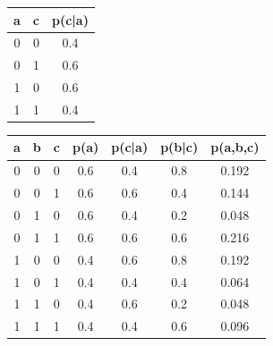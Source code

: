 \begin{exercise}
\begin{solution}
\begin{table}[p]
\begin{tabular}{ccc}
    \hline
    a & c & p(c|a) \\ \hline
    0 & 0 & 0.4    \\
    0 & 1 & 0.6    \\
    1 & 0 & 0.6    \\
    1 & 1 & 0.4    \\ \hline
    \end{tabular}

\begin{tabular}{ccccccc}
    \hline
    a & b & c & p(a) & p(c|a) & p(b|c) & p(a,b,c) \\ \hline
    0 & 0 & 0 & 0.6  & 0.4    & 0.8    & 0.192    \\
    0 & 0 & 1 & 0.6  & 0.6    & 0.4    & 0.144    \\
    0 & 1 & 0 & 0.6  & 0.4    & 0.2    & 0.048    \\
    0 & 1 & 1 & 0.6  & 0.6    & 0.6    & 0.216    \\
    1 & 0 & 0 & 0.4  & 0.6    & 0.8    & 0.192    \\
    1 & 0 & 1 & 0.4  & 0.4    & 0.4    & 0.064    \\
    1 & 1 & 0 & 0.4  & 0.6    & 0.2    & 0.048    \\
    1 & 1 & 1 & 0.4  & 0.4    & 0.6    & 0.096    \\ \hline
    \end{tabular}
\end{table}


  \end{solution}
  \label{ex1}
\end{exercise}


\newpage


